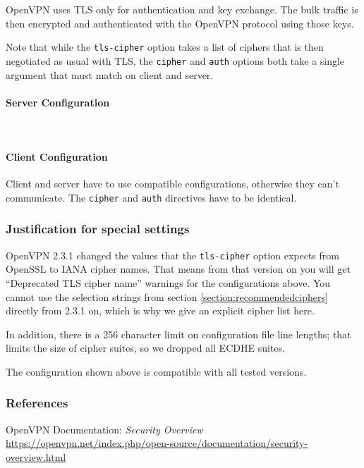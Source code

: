OpenVPN uses TLS only for authentication and key exchange. The
bulk traffic is then encrypted and authenticated with the OpenVPN
protocol using those keys.

Note that while the \verb|tls-cipher| option takes a list of ciphers
that is then negotiated as usual with TLS, the \verb|cipher|
and \verb|auth| options both take a single argument that must match on
client and server.

\paragraph{Server Configuration}
~\\

\paragraph{Client Configuration}
Client and server have to use compatible configurations, otherwise they can't communicate.
The \verb|cipher| and \verb|auth| directives have to be identical.


\subsubsection{Justification for special settings}
OpenVPN 2.3.1 changed the values that the \verb|tls-cipher| option
expects from OpenSSL to IANA cipher names. That means from that
version on you will get ``Deprecated TLS cipher name'' warnings for
the configurations above. You cannot use the selection strings from
section \ref{section:recommendedciphers} directly from 2.3.1 on, which
is why we give an explicit cipher list here.

In addition, there is a 256 character limit on configuration file line
lengths; that limits the size of cipher suites, so we dropped all
ECDHE suites.

The configuration shown above is compatible with all tested versions.


\subsubsection{References}
\begin{itemize*}
  \item OpenVPN Documentation: \emph{Security Overview} \url{https://openvpn.net/index.php/open-source/documentation/security-overview.html}
\end{itemize*}

